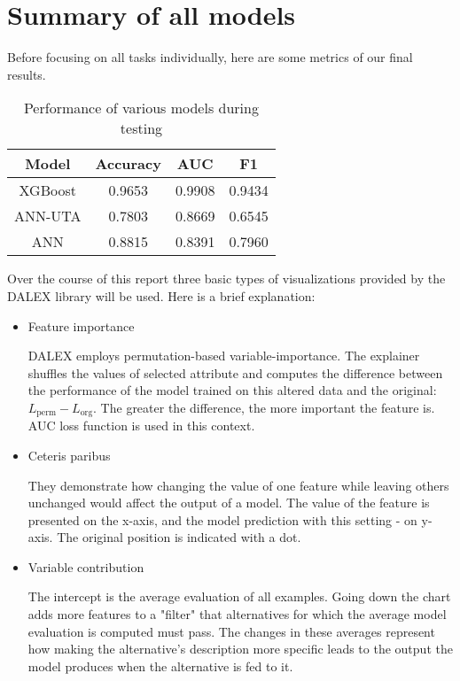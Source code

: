 \documentclass[../main.tex]{subfiles}
\begin{document}
\section{Summary of all models}
Before focusing on all tasks individually, here are some metrics of our final
results.

\begin{table}[H]
	\begin{center}
		\begin{tabular}{c||c|c|c}
			\hline
			Model & Accuracy & AUC & F1 \\
			\hline
			\hline
			XGBoost & 0.9653 & 0.9908 & 0.9434 \\
			ANN-UTA & 0.7803 & 0.8669 & 0.6545 \\
			ANN     & 0.8815 & 0.8391 & 0.7960 \\
			\hline
		\end{tabular}
		\caption{Performance of various models during testing}
		\label{table:perf}
	\end{center}
\end{table}

Over the course of this report three basic types of visualizations provided by the
DALEX library will be used. Here is a brief explanation:
\begin{itemize}

\item Feature importance

DALEX employs permutation-based variable-importance. The explainer shuffles
the values of selected attribute and computes the difference between the performance
of the model trained on this altered data and the original: $L_{\mathrm{perm}} - L_{\mathrm{org}}$. The greater the
difference, the more important the feature is.
AUC loss function is used in this context.

\item Ceteris paribus

They demonstrate how changing the value of one feature while leaving others
unchanged would affect the output of a model.
The value of the feature is presented on the x-axis, and the model prediction
with this setting - on y-axis.
The original position is indicated with a dot.

\item Variable contribution

The intercept is the average evaluation of all examples. Going down the chart
adds more features to a "filter" that alternatives for which the average model
evaluation is computed must pass. The changes in these averages represent how
making the alternative's description more specific leads to the output the model
produces when the alternative is fed to it.

\end{itemize}
\end{document}
